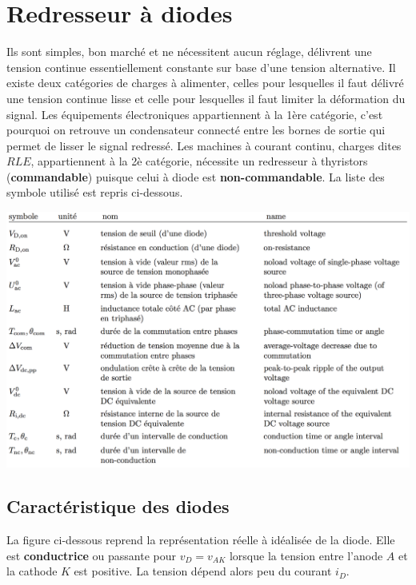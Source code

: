 
\chapter{Redresseur à diodes}
	
	Ils sont simples, bon marché et ne nécessitent aucun réglage, délivrent une tension continue essentiellement constante sur base d'une tension alternative. Il existe deux catégories de charges à alimenter, celles pour lesquelles il faut délivré une tension continue lisse et celle pour lesquelles il faut limiter la déformation du signal. Les équipements électroniques appartiennent à la 1ère catégorie, c'est pourquoi on retrouve un condensateur connecté entre les bornes de sortie qui permet de lisser le signal redressé. Les machines à courant continu, charges dites $RLE$, appartiennent à la 2è catégorie, nécessite un redresseur à thyristors (\textbf{commandable}) puisque celui à diode est \textbf{non-commandable}. La liste des symbole utilisé est repris ci-dessous.
	
	\begin{center}
	\includegraphics[scale=0.45]{ch2/1}
	\end{center}
	\newpage
	
	\section{Caractéristique des diodes}
		La figure ci-dessous reprend la représentation réelle à idéalisée de la diode. Elle est \textbf{conductrice} ou passante pour $v_D=v_{AK}$ lorsque la tension entre l'anode $A$ et la cathode $K$ est positive. La tension dépend alors peu du courant $i_D$. 
		
